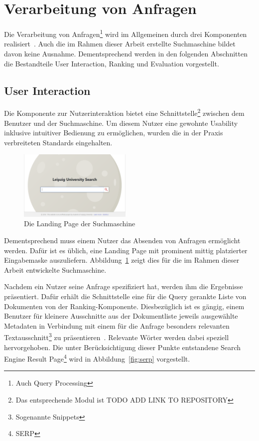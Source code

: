 \section{Verarbeitung von Anfragen}
\label{chap:query_processing}

Die Verarbeitung von Anfragen\footnote{Auch Query Processing} wird im Allgemeinen durch drei Komponenten realisiert~\cite{croft.chap2}.
Auch die im Rahmen dieser Arbeit erstellte Suchmaschine bildet davon keine Ausnahme.
Dementsprechend werden in den folgenden Abschnitten die Bestandteile User Interaction, Ranking und Evaluation vorgestellt.

\subsection{User Interaction~\cite{croft.chap2}}
\label{chap:user_interaction}

Die Komponente zur Nutzerinteraktion bietet eine Schnittstelle\footnote{Das entsprechende Modul ist TODO ADD LINK TO REPOSITORY}
zwischen dem Benutzer und der Suchmaschine.
Um diesem Nutzer eine gewohnte Usability inklusive intuitiver Bedienung zu ermöglichen,
wurden die in der Praxis verbreiteten Standards eingehalten.

\begin{figure}
	\vspace*{-0.4cm}
	\includegraphics[width=0.48\textwidth]{chapter_query_processing/frontend_landing_page.png}
	\caption{Die Landing Page der Suchmaschine}
	\label{fig:landing_page}
	\vspace*{-0.2cm}
\end{figure}


Dementsprechend muss einem Nutzer das Absenden von Anfragen ermöglicht werden.
Dafür ist es üblich, eine Landing Page mit prominent mittig platzierter Eingabemaske auszuliefern\cite{}.
Abbildung~\ref{fig:landing_page} zeigt dies für die im Rahmen dieser Arbeit entwickelte Suchmaschine.

Nachdem ein Nutzer seine Anfrage spezifiziert hat, werden ihm die Ergebnisse präsentiert.
Dafür erhält die Schnittstelle eine für die Query gerankte Liste von Dokumenten von der Ranking-Komponente.
Diesbezüglich ist es gängig, einem Benutzer für kleinere Ausschnitte aus der Dokumentliste jeweils 
ausgewählte Metadaten in Verbindung mit einem 
für die Anfrage besonders relevanten Textausschnitt\footnote{Sogenannte Snippets} zu präsentieren~\cite{}.
Relevante Wörter werden dabei speziell hervorgehoben.
Die unter Berücksichtigung dieser Punkte entstandene Search Engine Result Page\footnote{SERP} wird in Abbildung~\ref{fig:serp} vorgestellt.


